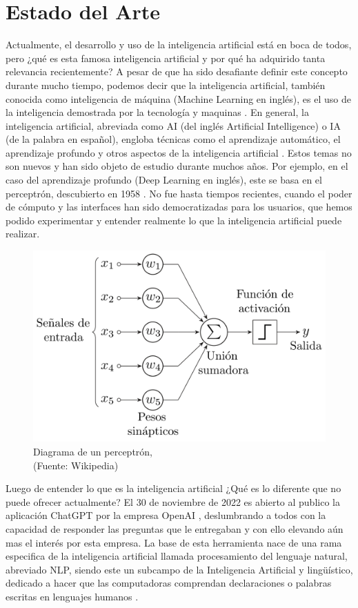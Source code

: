 
\chapter{Estado del Arte}


\par Actualmente, el desarrollo y uso de la inteligencia artificial está en boca de todos, pero ¿qué es esta famosa 
inteligencia artificial y por qué ha adquirido tanta relevancia recientemente? A pesar de que ha sido desafiante
definir este concepto durante mucho tiempo, podemos decir que la inteligencia artificial, también conocida 
como inteligencia de máquina (Machine Learning en inglés), es el uso de la inteligencia demostrada por la 
tecnología y maquinas \cite{mt1}. En general, la inteligencia artificial, abreviada como AI (del inglés Artificial Intelligence) 
o IA (de la palabra en español), engloba técnicas como el aprendizaje automático, el aprendizaje profundo y
otros aspectos de la inteligencia artificial \cite{mt1}. Estos temas no son nuevos y han sido objeto de estudio durante 
muchos años. Por ejemplo, en el caso del aprendizaje profundo (Deep Learning en inglés), este se basa en el 
perceptrón, descubierto en 1958 \cite{perceptron}. No fue hasta tiempos recientes, cuando el poder de cómputo y las interfaces 
han sido democratizadas para los usuarios, que hemos podido experimentar y entender realmente lo que la 
inteligencia artificial puede realizar.


\begin{figure}[ht!]
    \centering
    \includegraphics[width=.6\textwidth]{figures/ea1.png}
    \caption[Estructura del perceptrón]{Diagrama de un perceptrón,\\
    {\scriptsize (Fuente: Wikipedia)}}
    \label{fig:ea1}
\end{figure}

\par Luego de entender lo que es la inteligencia artificial ¿Qué es lo diferente que no puede ofrecer actualmente? 
El 30 de noviembre de 2022 es abierto al publico la aplicación ChatGPT por la empresa OpenAI \cite{mt3}, deslumbrando a todos 
con la capacidad de responder las preguntas que le entregaban y con ello elevando aún mas el interés por esta empresa.
La base de esta herramienta nace de una rama especifica de la inteligencia artificial llamada procesamiento del lenguaje 
natural, abreviado NLP, siendo este un subcampo de la Inteligencia Artificial y lingüístico, dedicado a hacer que las 
computadoras comprendan declaraciones o palabras escritas en lenguajes humanos \cite{nlpeda}.


